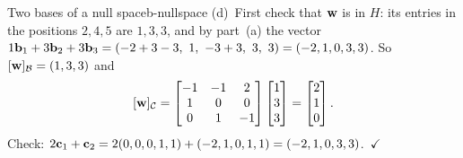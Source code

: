 \documentclass[11pt]{article}
\begin{document}
\begin{exmp}{Two bases of a null space}{b-nullspace}
(d)~First check that $\mathbf{w}$ is in $H$: its entries in the positions $2,4,5$ are $1,3,3$, and by part~(a) the vector $1\bv{b}_1+3\bv{b}_2+3\bv{b}_3=(-2+3-3,\ 1,\ -3+3,\ 3,\ 3)=(-2,1,0,3,3)$. So $[\mathbf{w}]_{\mathcal{B}}=(1,3,3)$ and
\[
[\mathbf{w}]_{\mathcal{C}}=\begin{bmatrix}-1&-1&2\\1&0&0\\0&1&-1\end{bmatrix}\begin{bmatrix}1\\3\\3\end{bmatrix}=\begin{bmatrix}2\\1\\0\end{bmatrix}.
\]
Check: $2\mathbf{c}_1+\mathbf{c}_2=2(0,0,0,1,1)+(-2,1,0,1,1)=(-2,1,0,3,3)$.\ $\checkmark$
\end{exmp}
\end{document}
